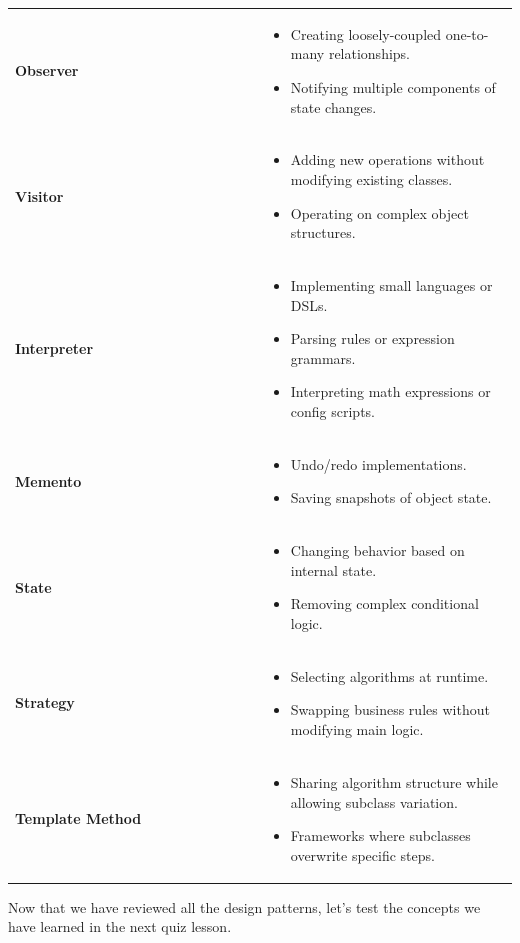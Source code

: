 {\begin{longtable}{%
>{\centering\arraybackslash}p{0.5\linewidth}%
>{\centering\arraybackslash}p{0.5\linewidth}%
}
\textbf{Observer} &
\begin{itemize}
    \item Creating loosely-coupled one-to-many relationships.
    \item Notifying multiple components of state changes.
\end{itemize}
\\

\textbf{Visitor} &
\begin{itemize}
    \item Adding new operations without modifying existing classes.
    \item Operating on complex object structures.
\end{itemize}
\\

\textbf{Interpreter} &
\begin{itemize}
    \item Implementing small languages or DSLs.
    \item Parsing rules or expression grammars.
    \item Interpreting math expressions or config scripts.
\end{itemize}
\\

\textbf{Memento} &
\begin{itemize}
    \item Undo/redo implementations.
    \item Saving snapshots of object state.
\end{itemize}
\\

\textbf{State} &
\begin{itemize}
    \item Changing behavior based on internal state.
    \item Removing complex conditional logic.
\end{itemize}
\\

\textbf{Strategy} &
\begin{itemize}
    \item Selecting algorithms at runtime.
    \item Swapping business rules without modifying main logic.
\end{itemize}
\\

\textbf{Template Method} &
\begin{itemize}
    \item Sharing algorithm structure while allowing subclass variation.
    \item Frameworks where subclasses overwrite specific steps.
\end{itemize}
\\

\end{longtable}
}

Now that we have reviewed all the design patterns, let's test the concepts we have learned in the next quiz lesson.

